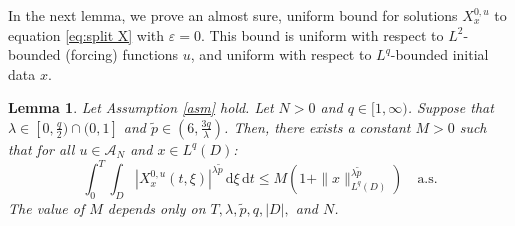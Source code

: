 \documentclass[10pt,a4paper]{amsart}
\newtheorem{lemma}[theorem]{Lemma}
\numberwithin{equation}{section}
\newcommand{\eps}{\varepsilon}
\newcommand{\A}{{\mathcal A}}
\newcommand{\dd}{\,\mathrm{d}}
\begin{document}
In the next lemma, we prove an almost sure, uniform  bound for solutions $X_x^{0,u}$ to equation \eqref{eq:split X} with $\eps=0$. 
This bound is uniform with respect to $L^2$-bounded (forcing) functions $u$, and uniform with respect to $L^q$-bounded initial data $x$. 

 
\begin{lemma} 
\label{lem:conv Linfty} Let Assumption \ref{asm} hold. Let $N>0$ and $q\in[1,\infty)$. 
  Suppose that $\lambda\in [0,\frac{q}{2})\cap (0,1]$ and $\tilde p\in (6,\frac{3q}{\lambda})$. 
  Then, there exists a constant $M>0$ such that for all $u\in\A_N$ and  $x\in L^q(D)$: 
  \begin{equation}\label{eq:toshow}
\int_0^T\int_D  |X_x^{0,u}(t,\xi)|^{\lambda \tilde p}\dd\xi\dd t \leq M(1+\|x\|_{L^q(D)}^{\lambda \tilde p}) \quad\text{a.s.}
  \end{equation}
  The value of $M$ depends only on $T,\lambda,\tilde p,q,|D|,$ and $N$.
\end{lemma} 
\end{document}
